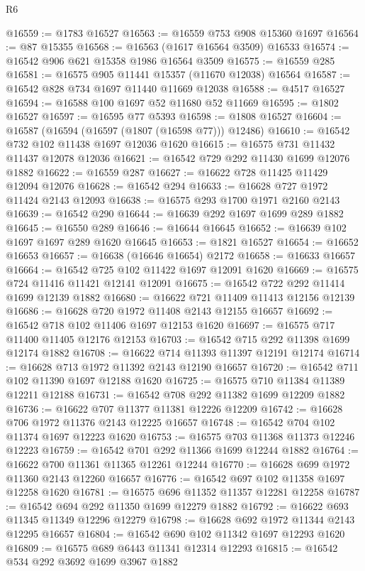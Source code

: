 \begin{lexlean}{R6}
\begin{coremodule}
@16559 := @1783 @16527
@16563 := @16559 @753 @908 @15360 @1697
@16564 := @87 @15355
@16568 := @16563 (@1617 @16564 @3509) @16533
@16574 := @16542 @906 @621 @15358 @1986 @16564 @3509
@16575 := @16559 @285
@16581 := @16575 @905 @11441 @15357 (@11670 @12038) @16564
@16587 := @16542 @828 @734 @1697 @11440 @11669 @12038
@16588 := @4517 @16527
@16594 := @16588 @100 @1697 @52 @11680 @52 @11669
@16595 := @1802 @16527
@16597 := @16595 @77 @5393
@16598 := @1808 @16527
@16604 := @16587 (@16594 (@16597 (@1807 (@16598 @77))) @12486)
@16610 := @16542 @732 @102 @11438 @1697 @12036 @1620
@16615 := @16575 @731 @11432 @11437 @12078 @12036
@16621 := @16542 @729 @292 @11430 @1699 @12076 @1882
@16622 := @16559 @287
@16627 := @16622 @728 @11425 @11429 @12094 @12076
@16628 := @16542 @294
@16633 := @16628 @727 @1972 @11424 @2143 @12093
@16638 := @16575 @293 @1700 @1971 @2160 @2143
@16639 := @16542 @290
@16644 := @16639 @292 @1697 @1699 @289 @1882
@16645 := @16550 @289
@16646 := @16644 @16645
@16652 := @16639 @102 @1697 @1697 @289 @1620 @16645
@16653 := @1821 @16527
@16654 := @16652 @16653
@16657 := @16638 (@16646 @16654) @2172
@16658 := @16633 @16657
@16664 := @16542 @725 @102 @11422 @1697 @12091 @1620
@16669 := @16575 @724 @11416 @11421 @12141 @12091
@16675 := @16542 @722 @292 @11414 @1699 @12139 @1882
@16680 := @16622 @721 @11409 @11413 @12156 @12139
@16686 := @16628 @720 @1972 @11408 @2143 @12155 @16657
@16692 := @16542 @718 @102 @11406 @1697 @12153 @1620
@16697 := @16575 @717 @11400 @11405 @12176 @12153
@16703 := @16542 @715 @292 @11398 @1699 @12174 @1882
@16708 := @16622 @714 @11393 @11397 @12191 @12174
@16714 := @16628 @713 @1972 @11392 @2143 @12190 @16657
@16720 := @16542 @711 @102 @11390 @1697 @12188 @1620
@16725 := @16575 @710 @11384 @11389 @12211 @12188
@16731 := @16542 @708 @292 @11382 @1699 @12209 @1882
@16736 := @16622 @707 @11377 @11381 @12226 @12209
@16742 := @16628 @706 @1972 @11376 @2143 @12225 @16657
@16748 := @16542 @704 @102 @11374 @1697 @12223 @1620
@16753 := @16575 @703 @11368 @11373 @12246 @12223
@16759 := @16542 @701 @292 @11366 @1699 @12244 @1882
@16764 := @16622 @700 @11361 @11365 @12261 @12244
@16770 := @16628 @699 @1972 @11360 @2143 @12260 @16657
@16776 := @16542 @697 @102 @11358 @1697 @12258 @1620
@16781 := @16575 @696 @11352 @11357 @12281 @12258
@16787 := @16542 @694 @292 @11350 @1699 @12279 @1882
@16792 := @16622 @693 @11345 @11349 @12296 @12279
@16798 := @16628 @692 @1972 @11344 @2143 @12295 @16657
@16804 := @16542 @690 @102 @11342 @1697 @12293 @1620
@16809 := @16575 @689 @6443 @11341 @12314 @12293
@16815 := @16542 @534 @292 @3692 @1699 @3967 @1882

\end{coremodule}
\end{lexlean}
